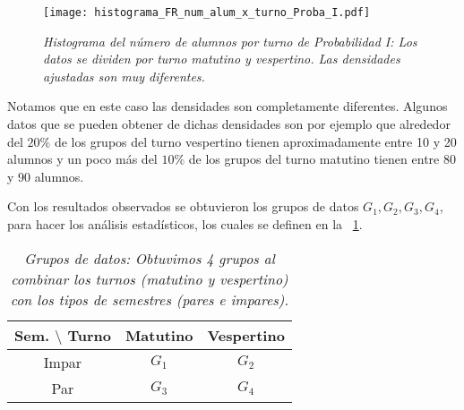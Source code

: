 
\begin{figure}[h]
\centering
\texttt{[image: histograma\_FR\_num\_alum\_x\_turno\_Proba\_I.pdf]} %
\caption[\textit{Histograma del número de alumnos por turno: Probabilidad I}]{\textit{Histograma del número de alumnos por turno de Probabilidad I: Los datos se dividen por turno matutino y vespertino. Las densidades ajustadas son muy diferentes.}}\label{HistAlumTurnoProbaI}
\end{figure}

Notamos que en este caso las densidades son completamente diferentes. Algunos datos que se pueden obtener de dichas densidades son por ejemplo que alrededor del $20\%$ de los grupos del turno vespertino tienen aproximadamente entre 10 y 20 alumnos y un poco más del $10\%$ de los grupos del turno matutino tienen entre 80 y 90 alumnos.

\pagebreak %

Con los resultados observados se obtuvieron los grupos de datos $G_{1}, G_{2}, G_{3}, G_{4}$, para hacer los análisis estadísticos, los cuales se definen en la \tablename{~\ref{GposDatos}}.

\begin{table}[H]
\centering
\begin{tabular}{|c|c|c|}
\hline 
\textbf{Sem.} $\setminus$ \textbf{Turno} & \textbf{Matutino} & \textbf{Vespertino} \\ 
\hline 
Impar & $G_{1}$ & $G_{2}$ \\ 
\hline 
Par & $G_{3}$ & $G_{4}$ \\ 
\hline 
\end{tabular}
\caption[\textit{Grupos de datos}]{\textit{Grupos de datos: Obtuvimos 4 grupos al combinar los turnos (matutino y vespertino) con los tipos de semestres (pares e impares).}}\label{GposDatos}
\end{table}
